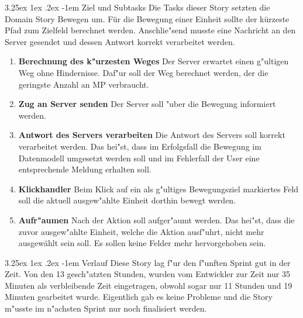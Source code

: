 \documentclass[12pt, titlepage]{scrartcl}
\makeatletter
\renewcommand\paragraph{\@startsection{paragraph}{5}{\z@}%
  {3.25ex \@plus1ex \@minus.2ex}%
  {-1em}%
  {\normalfont\normalsize\bfseries}}
\makeatother
\begin{document}
	            \paragraph{Ziel und Subtasks}
				Die Tasks dieser Story setzten die Domain Story Bewegen um.
	                	F\"ur die Bewegung einer Einheit sollte der k\"urzeste Pfad zum Zielfeld berechnet werden. Anschlie"send musste eine Nachricht an den Server gesendet und dessen Antwort korrekt verarbeitet werden.
	            	\begin{enumerate}[label={}]
	            		\item \textbf{Berechnung des k"urzesten Weges} \hspace{5pt} Der Server erwartet einen g"ultigen Weg ohne Hindernisse. Daf"ur soll der Weg berechnet werden, der die geringste Anzahl an MP verbraucht.
	            		\item \textbf{Zug an Server senden} \hspace{5pt} Der Server soll "uber die Bewegung informiert werden.
	            		\item \textbf{Antwort des Servers verarbeiten} \hspace{5pt} Die Antwort des Servers soll korrekt verarbeitet werden. Das hei"st, dass im Erfolgsfall die Bewegung im Datenmodell umgesetzt werden soll und im Fehlerfall der User eine entsprechende Meldung erhalten soll.
	            		\item \textbf{Klickhandler} \hspace{5pt} Beim Klick auf ein als g"ultiges Bewegungsziel markiertes Feld soll die aktuell ausgew"ahlte Einheit dorthin bewegt werden.
	            		\item \textbf{Aufr"aumen} \hspace{5pt} Nach der Aktion soll aufger"aumt werden. Das hei"st, dass die zuvor ausgew"ahlte Einheit, welche die Aktion ausf"uhrt, nicht mehr ausgew\"ahlt sein soll. Es sollen keine Felder mehr hervorgehoben sein.
	            	\end{enumerate}
            	\paragraph{Verlauf}
            		Diese Story lag f"ur den f"unften Sprint gut in der Zeit. Von den 13 gesch"atzten Stunden, wurden vom Entwickler zur Zeit nur 35 Minuten als verbleibende Zeit eingetragen, obwohl sogar nur 11 Stunden und 19 Minuten gearbeitet wurde. Eigentlich gab es keine Probleme und die Story m"usste im n"achsten Sprint nur noch finalisiert werden.
\end{document}
